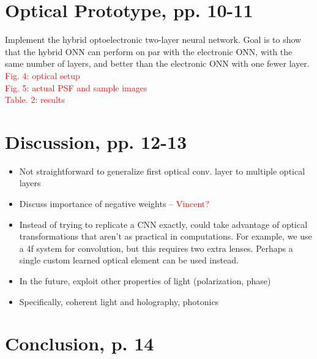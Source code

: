 \documentclass[runningheads]{llncs}
\newcommand{\red}[1]{\textcolor{red}{#1}}
\begin{document}
\section{Optical Prototype, pp. 10-11}
\label{sec:prototype}
Implement the hybrid optoelectronic two-layer neural network. Goal is to show that the hybrid ONN can perform on par with the electronic ONN, with the same number of layers, and better than the electronic ONN with one fewer layer.\\
\red{Fig. 4: optical setup} \\
\red{Fig. 5: actual PSF and sample images} \\
\red{Table. 2: results}

\section{Discussion, pp. 12-13}
\label{sec:discussion}
\begin{itemize}
\item Not straightforward to generalize first optical conv. layer to multiple optical layers
\item Discuss importance of negative weights – \red{Vincent?}
\item Instead of trying to replicate a CNN exactly, could take advantage of optical transformations that aren't as practical in computations. For example, we use a 4f system for convolution, but this requires two extra lenses. Perhaps a single custom learned optical element can be used instead.
\item In the future, exploit other properties of light (polarization, phase)	
\item Specifically, coherent light and holography, photonics
\end{itemize}

\section{Conclusion, p. 14}
\label{sec:conclusion}


\clearpage



\end{document}
